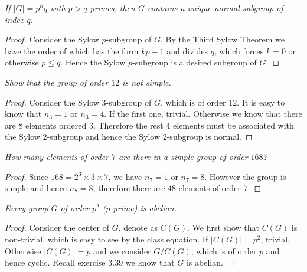 \begin{problem}\em
If $|G|=p^nq$ with $p>q$ primes, then $G$ contains a unique normal subgroup of index $q$.
\end{problem}
\begin{proof}
Consider the Sylow $p$-subgroup of $G$. By the Third Sylow Theorem we have the order of which has the form $kp+1$ and divides $q$, which forces $k=0$ or otherwise $p\le q$. Hence the Sylow $p$-subgroup is a desired subgroup of $G$.
\end{proof}
\begin{problem}\em
Show that the group of order $12$ is not simple.
\end{problem}
\begin{proof}
Consider the Sylow $3$-subgroup of $G$, which is of order $12$. It is easy to know that $n_3=1$ or $n_3=4$. If the first one, trivial. Otherwise we know that there are $8$ elements ordered $3$. Therefore the rest $4$ elements must be associated with the Sylow $2$-subgroup and hence the Sylow $2$-subgroup is normal.
\end{proof}
\begin{problem}\em
How many elements of order $7$ are there in a simple group of order $168$?
\end{problem}
\begin{proof}
Since $168=2^3\times 3\times 7$, we have $n_7=1$ or $n_7=8$. However the group is simple and hence $n_7=8$, therefore there are $48$ elements of order $7$.
\end{proof}
\begin{problem}\em
Every group $G$ of order $p^2$ ($p$ prime) is abelian.
\end{problem}
\begin{proof}
Consider the center of $G$, denote as $C(G)$. We first show that $C(G)$ is non-trivial, which is easy to see by the class equation. If $|C(G)|=p^2$, trivial. Otherwise $|C(G)|=p$ and we consider $G/C(G)$, which is of order $p$ and hence cyclic. Recall exercise 3.39 we know that $G$ is abelian.
\end{proof}
